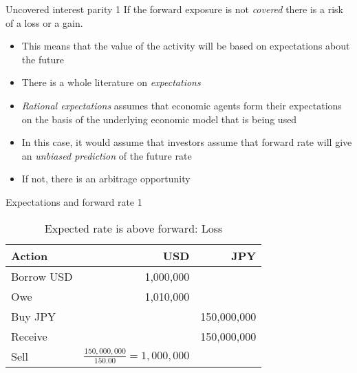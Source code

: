 \documentclass[14pt,xcolor=pdftex,dvipsnames,table]{beamer}\usepackage[]{graphicx}\usepackage[]{color}
\begin{document}

\begin{frame}{Uncovered interest parity 1}
If the forward exposure is not \emph{covered} there is a risk of a loss or a gain.
\pause
\begin{itemize}[<+-| alert@+>]
\item This means that the value of the activity will be based on expectations about the future
\item There is a whole literature on \emph{expectations}
\item \emph{Rational expectations} assumes that economic agents form their expectations on the basis of the underlying economic model that is being used
\item In this case, it would assume that investors assume that forward rate will give an \emph{unbiased prediction} of  the future rate
\item If not, there is an arbitrage opportunity
\end{itemize}
\end{frame}

\begin{frame}{Expectations and forward rate 1}
\begin{table}[h!]
\begin{center}
\begin{tabular}{l r r}
\textbf{Action} & \textbf{USD} & \textbf{JPY}\\
\hline
Borrow USD & 1,000,000 & \\
Owe & 1,010,000&  \\
Buy JPY & & 150,000,000\\
Receive & & 150,000,000\\
Sell & $\frac{150,000,000}{150.00} = 1,000,000$ &
\end{tabular}
\end{center}
\caption{Expected rate is above forward: Loss}
\label{tabref:cip2}
\end{table}
\end{frame}
\end{document}
